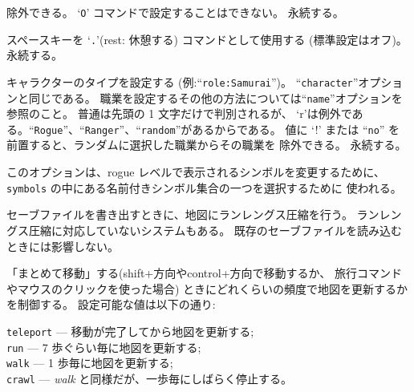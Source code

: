除外できる。
`{\tt O}' コマンドで設定することはできない。
永続する。
\item[\ib{rest\verb+_+on\verb+_+space}]
スペースキーを `{\tt .}'(rest: 休憩する) コマンドとして使用する
(標準設定はオフ)。
永続する。
\item[\ib{role}]
キャラクターのタイプを設定する (例:``{\tt role:Samurai}'')。
``{\tt character}''オプションと同じである。
職業を設定するその他の方法については``{\tt name}''オプションを参照のこと。
普通は先頭の 1 文字だけで判別されるが、
`r'は例外である。``{\tt Rogue}''、``{\tt Ranger}''、``{\tt random}''があるからである。
値に `!' または ``{\tt no}'' を前置すると、ランダムに選択した職業からその職業を
除外できる。
永続する。
\item[\ib{roguesymset}]
このオプションは、rogue レベルで表示されるシンボルを変更するために、
{\tt symbols} の中にある名前付きシンボル集合の一つを選択するために
使われる。
\item[\ib{rlecomp}]
セーブファイルを書き出すときに、地図にランレングス圧縮を行う。
ランレングス圧縮に対応していないシステムもある。
既存のセーブファイルを読み込むときには影響しない。
\item[\ib{runmode}]
「まとめて移動」する(shift+方向やcontrol+方向で移動するか、
旅行コマンドやマウスのクリックを使った場合)
ときにどれくらいの頻度で地図を更新するかを制御する。
設定可能な値は以下の通り:

{\tt teleport} --- 移動が完了してから地図を更新する;\\
{\tt run} --- 7 歩ぐらい毎に地図を更新する;\\
{\tt walk} --- 1 歩毎に地図を更新する;\\
{\tt crawl} --- {\it walk\/} と同様だが、一歩毎にしばらく停止する。

